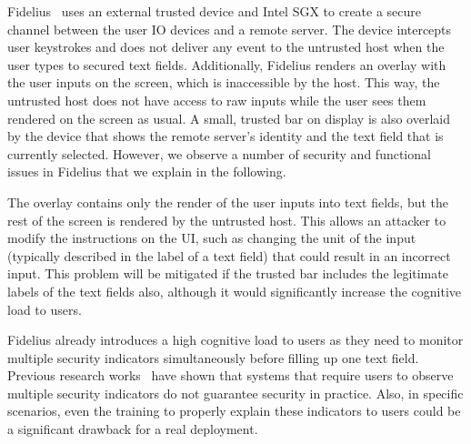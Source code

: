 Fidelius~\cite{Fidelius} uses an external trusted device and Intel SGX to create a secure channel between the user IO devices and a remote server. The device intercepts user keystrokes and does not deliver any event to the untrusted host when the user types to secured text fields. Additionally, Fidelius renders an overlay with the user inputs on the screen, which is inaccessible by the host. This way, the untrusted host does not have access to raw inputs while the user sees them rendered on the screen as usual.
A small, trusted bar on display is also overlaid by the device that shows the remote server's identity and the text field that is currently selected. 
However, we observe a number of security and functional issues in Fidelius that we explain in the following.

The overlay contains only the render of the user inputs into text fields, but the rest of the screen is rendered by the untrusted host.
This allows an attacker to modify the instructions on the UI, such as changing the unit of the input (typically described in the label of a text field) that could result in an incorrect input. This problem will be mitigated if the trusted bar includes the legitimate labels of the text fields also, although it would significantly increase the cognitive load to users.

Fidelius already introduces a high cognitive load to users as they need to monitor multiple security indicators simultaneously before filling up one text field. Previous research works~\cite{egelman2008you,sobey2008exploring, anderson2016warning} have shown that systems that require users to observe multiple security indicators %
do not guarantee security in practice.
Also, in specific scenarios, even the training to properly explain these indicators to users could be a significant drawback for a real deployment.

